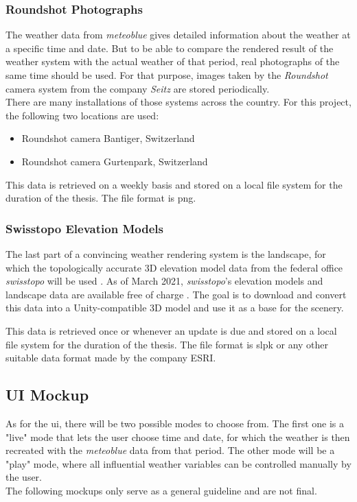 \subsubsection{Roundshot Photographs}
The weather data from \emph{meteoblue} gives detailed information about the weather at a specific time and date.
But to be able to compare the rendered result of the weather system with the actual weather of that period, real photographs of the same time should be used.
For that purpose, images taken by the \emph{Roundshot} camera system from the company \emph{Seitz} \cite{roundshot} are stored periodically.
\\
There are many installations of those systems across the country. For this project, the following two locations are used: 
\begin{itemize}
    \item Roundshot camera Bantiger, Switzerland \cite{bantiger}
    \item Roundshot camera Gurtenpark, Switzerland \cite{gurtenpark}
\end{itemize}

\noindent
This data is retrieved on a weekly basis and stored on a local file system for the duration of the thesis. The file format is \gls{png}.

\subsubsection{Swisstopo Elevation Models}
The last part of a convincing weather rendering system is the landscape, for which the topologically accurate 3D elevation model data from the federal office \emph{swisstopo} will be used \cite{swisstopo}.
As of March 2021, \emph{swisstopo}'s elevation models and landscape data are available free of charge \cite{swisstopo:free}.
The goal is to download and convert this data into a Unity-compatible 3D model and use it as a base for the scenery.

\noindent
This data is retrieved once or whenever an update is due and stored on a local file system for the duration of the thesis. The file format is \gls{slpk} or any other suitable data format made by the company ESRI.

\clearpage

\subsection{UI Mockup}
\label{section:vision:ui}
As for the \gls{ui}, there will be two possible modes to choose from.
The first one is a "live" mode that lets the user choose time and date, for which the weather is then recreated with the \emph{meteoblue} data from that period.
The other mode will be a "play" mode, where all influential weather variables can be controlled manually by the user.
\\
The following mockups only serve as a general guideline and are not final.


